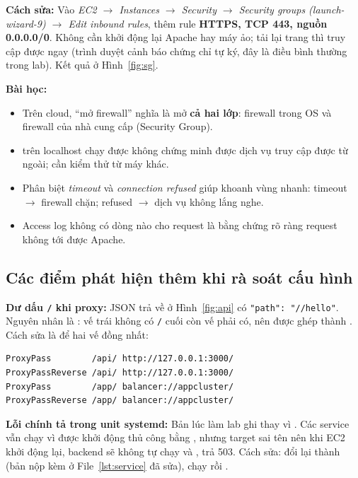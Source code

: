 \textbf{\large Cách sửa:} Vào \textit{EC2 $\to$ Instances $\to$ Security $\to$
Security groups (launch-wizard-9) $\to$ Edit inbound rules}, thêm rule
\textbf{HTTPS, TCP 443, nguồn 0.0.0.0/0}. Không cần khởi động lại Apache hay máy
ảo; tải lại trang thì truy cập được ngay (trình duyệt cảnh báo chứng chỉ tự ký,
đây là điều bình thường trong lab). Kết quả ở Hình~\ref{fig:sg}.

\textbf{\large Bài học:}
\begin{itemize}
  \item Trên cloud, ``mở firewall'' nghĩa là mở \textbf{cả hai lớp}: firewall
        trong OS và firewall của nhà cung cấp (Security Group).
  \item {} trên localhost chạy được không chứng minh được dịch vụ truy
        cập được từ ngoài; cần kiểm thử từ máy khác.
  \item Phân biệt \emph{timeout} và \emph{connection refused} giúp khoanh vùng
        nhanh: timeout $\to$ firewall chặn; refused $\to$ dịch vụ không lắng nghe.
  \item Access log không có dòng nào cho request là bằng chứng rõ ràng request
        không tới được Apache.
\end{itemize}

\subsection{Các điểm phát hiện thêm khi rà soát cấu hình}

\textbf{\large Dư dấu \texttt{/} khi proxy:} JSON trả về ở Hình~\ref{fig:api} có
\texttt{"path": "//hello"}. Nguyên nhân là
: vế trái không có \texttt{/} cuối
còn vế phải có, nên  được ghép thành
. Cách sửa là để hai vế đồng nhất:
\begin{verbatim}
ProxyPass        /api/ http://127.0.0.1:3000/
ProxyPassReverse /api/ http://127.0.0.1:3000/
ProxyPass        /app/ balancer://appcluster/
ProxyPassReverse /app/ balancer://appcluster/
\end{verbatim}

\textbf{\large Lỗi chính tả trong unit systemd:} Bản  lúc
làm lab ghi  thay vì .
Các service vẫn chạy vì được khởi động thủ công bằng
, nhưng target sai tên nên khi EC2 khởi động lại,
backend sẽ không tự chạy và ,  trả 503. Cách sửa: đổi lại
thành  (bản nộp kèm ở File~\ref{lst:service} đã sửa),
chạy  rồi
.
